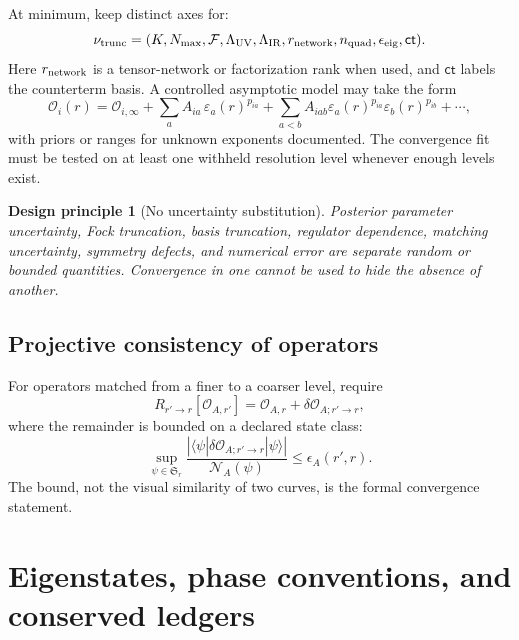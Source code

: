 \documentclass[11pt]{article}
\newtheorem{principle}[definition]{Design principle}
\newcommand{\cO}{\mathcal O}
\newcommand{\cN}{\mathcal N}
\newcommand{\cF}{\mathcal F}
\newcommand{\abs}[1]{\left|#1\right|}
\begin{document}
At minimum, keep distinct axes for:
\begin{equation}
 \nu_{\rm trunc}=
 (K,N_{\max},\cF,\Lambda_{\rm UV},\Lambda_{\rm IR},
 r_{\rm network},n_{\rm quad},\epsilon_{\rm eig},\mathsf{ct}).
\label{eq:truncation-axes}
\end{equation}
Here \(r_{\rm network}\) is a tensor-network or factorization rank when used,
and \(\mathsf{ct}\) labels the counterterm basis.  A controlled asymptotic
model may take the form
\begin{equation}
 \cO_i(r)
 =\cO_{i,\infty}
 +\sum_a A_{ia}\,\varepsilon_a(r)^{p_{ia}}
 +\sum_{a<b}A_{iab}\varepsilon_a(r)^{p_{ia}}
 \varepsilon_b(r)^{p_{ib}}+\cdots,
\label{eq:convergence-model}
\end{equation}
with priors or ranges for unknown exponents documented.  The convergence fit
must be tested on at least one withheld resolution level whenever enough
levels exist.

\begin{principle}[No uncertainty substitution]
\label{prin:no-uncertainty-substitution}
Posterior parameter uncertainty, Fock truncation, basis truncation,
regulator dependence, matching uncertainty, symmetry defects, and numerical
error are separate random or bounded quantities.  Convergence in one cannot
be used to hide the absence of another.
\end{principle}

\subsection{Projective consistency of operators}

For operators matched from a finer to a coarser level, require
\begin{equation}
 R_{r'\to r}[\cO_{A,r'}]
 =\cO_{A,r}+\delta\cO_{A;r'\to r},
\label{eq:operator-projective-consistency}
\end{equation}
where the remainder is bounded on a declared state class:
\begin{equation}
 \sup_{\psi\in\mathfrak S_r}
 \frac{\abs{\langle\psi|\delta\cO_{A;r'\to r}|\psi\rangle}}
 {\cN_A(\psi)}
 \le \epsilon_{A}(r',r).
\label{eq:operator-remainder-bound}
\end{equation}
The bound, not the visual similarity of two curves, is the formal convergence
statement.

\section{Eigenstates, phase conventions, and conserved ledgers}
\label{sec:states}
\end{document}
